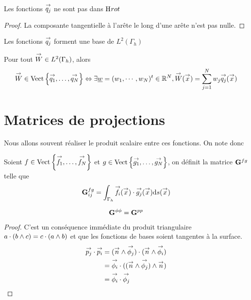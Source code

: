     \begin{prop}
      Les fonctions \(\qj\) ne sont pas dans \(\Hrot\)
    \end{prop}
    \begin{proof}
      La composante tangentielle à l'arête le long d'une arête n'est pas nulle.
    \end{proof}

    \begin{prop}
      Les fonctions \(\qj\) forment une base de \(L^2(\Gamma_h)\)
    \end{prop}

    \begin{defn}
      Pour tout \(\vect{W} \in L^2(\Gamma_h)\), alors
      \begin{equation*}
        \vect{W} \in \Vect{\vect{q_1},\ldots,\vect{q_N}} \Leftrightarrow \exists \comp{w} = (w_1,\cdots,w_N)^t \in \RR^N, \vect{W}(\vx) = \sum_{j=1}^N w_j \qj(\vx)
      \end{equation*}
    \end{defn}


\section{Matrices de projections}

  Nous allons souvent réaliser le produit scalaire entre ces fonctions. On note donc
  \begin{defn}
    Soient \(f \in \Vect{\vect{f_1},\ldots,\vect{f_N}}\) et \(g \in \Vect{\vect{g_1},\ldots,\vect{g_N}}\), on définit la matrice \(\mG{f}{g}\) telle que
    \begin{equation*}
      \mG{f}{g}_{ij} = \int_{\Gamma_h} \vect{f_i}(\vx)\cdot \vect{g_j}(\vx) \dd{s}(\vx)
    \end{equation*}
  \end{defn}

  \begin{prop}
    \begin{equation*}
      \mG{\phi}{\phi} = \mG{p}{p}
    \end{equation*}
  \end{prop}
  \begin{proof}
    C'est un conséquence immédiate du produit triangulaire \(a\cdot (b \pvect c) = c\cdot (a \pvect b)\) et que les fonctions de bases soient tangentes à la surface.
    \[
      \begin{aligned}
        \pj \cdot \pii &= (\vn \pvect \phij) \cdot ( \vn \pvect \phii)
        \\
        &= \phii \cdot ( (\vn \pvect \phij) \pvect \vn)
        \\
        &= \phii \cdot \phij
      \end{aligned}
    \]
  \end{proof}

